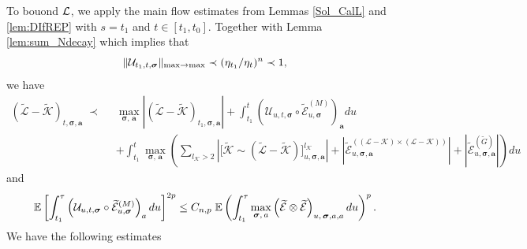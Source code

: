 \documentclass[10pt,reqno]{article}
\theoremstyle{plain} %
\theoremstyle{remark}
\numberwithin{equation}{section}
\begin{document}
To bouond $\cal L$, we apply the  main flow estimates from  Lemmas \ref{Sol_CalL} and \ref{lem:DIfREP} with  $s=t_1$ and $t\in [t_1,t_0]$. Together with Lemma \ref{lem:sum_Ndecay} which implies that 
$$
\|{\cal U}_{t_1,t,\boldsymbol{\sigma}}\|_{\max\to\max}\prec (\eta_{t_1}/\eta_{t})^n \prec 1, 
$$
we have 
\begin{align} \label{WLK1}
    (\mathcal{\widetilde{L}} - \mathcal{\widetilde{K}})_{t, \boldsymbol{\sigma}, \textbf{a}} \;\prec \; \; &
    \max_{\boldsymbol{\sigma}, \,\textbf{a}} \left|(\mathcal{\widetilde{L}} - \mathcal{\widetilde{K}})_{t_1, \boldsymbol{\sigma}, \textbf{a}} \right|
    +   \int_{t_1}^t \left(\mathcal{U}_{u, t, \boldsymbol{\sigma}} \circ \mathcal{\widetilde{E}}^{(M)}_{u, \boldsymbol{\sigma}}\right)_{\textbf{a}}  du \nonumber \\
    &+  \int_{t_1}^t \max_{\boldsymbol{\sigma}, \,\textbf{a}}   \left(\sum_{l_\mathcal{K} > 2} \left|\Big[\mathcal{\widetilde{K}} \sim (\mathcal{\widetilde{L}} - \mathcal{\widetilde{K}})\Big]^{l_\mathcal{K}}_{u, \boldsymbol{\sigma},\textbf{a}} \right|+ 
    \left|\mathcal{\widetilde{E}}^{((\mathcal{L} - \mathcal{K}) \times (\mathcal{L} - \mathcal{K}))}_{u, \boldsymbol{\sigma}, \textbf{a}}\right|
+\left|\mathcal{\widetilde{E}}^{(\widetilde{G})}_{u, \boldsymbol{\sigma}, \textbf{a}}\right|\right)du  \end{align}
and 
 \begin{equation} \label{WLK1.5}
   \mathbb{E} \left [    \int_{t_1}^\tau\left(\mathcal{U}_{u, t, \boldsymbol{\sigma}} \circ \mathcal{\widetilde{E}}^{(M)}_{u, \boldsymbol{\sigma}}\right)_{\textbf{a}} du \right ]^{2p} 
   \le C_{n,p} \; 
   \mathbb{E}  \left(
   \int_{t_1}^\tau 
   \max_{\boldsymbol{\sigma}, \,\textbf{a}}   
   \left( \mathcal{\widetilde{E}} \otimes  \mathcal{\widetilde{E}} \right)
   _{u, \,\boldsymbol{\sigma},{\textbf a}, {\textbf a}}du 
   \right)^{p}. 
  \end{equation} 
We  have the following estimates
\end{document}
